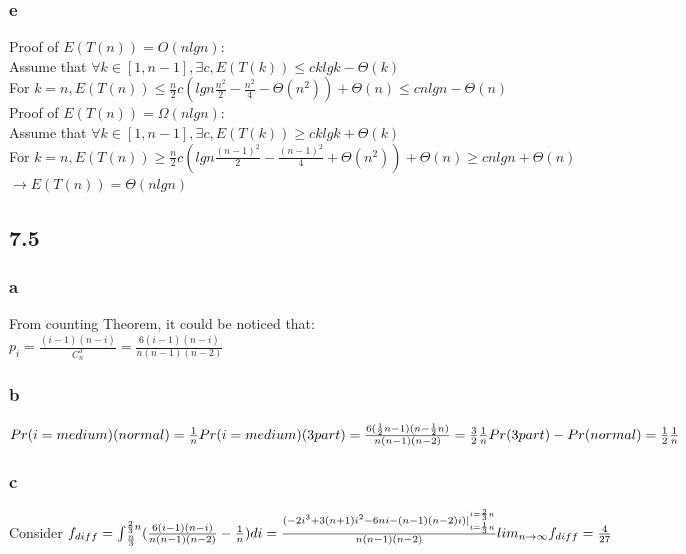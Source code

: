 \documentclass[]{article}
\begin{document}
\subsubsection{e}
Proof of $E(T(n)) = O(nlgn)$:\\
Assume that $\forall k \in [1, n-1], \exists c, E(T(k)) \le cklgk - \Theta(k)$\\
For $k = n, E(T(n)) \le \frac{n}{2}c(lgn\frac{n^2}{2} - \frac{n^2}{4} - \Theta (n^2)) + \Theta(n) \le cnlgn - \Theta(n) $\\
Proof of $E(T(n)) =\Omega(nlgn)$:\\
Assume that $\forall k \in [1, n-1], \exists c, E(T(k)) \ge cklgk + \Theta(k)$\\
For $k = n, E(T(n)) \ge \frac{n}{2}c(lgn\frac{(n-1)^2}{2} - \frac{(n-1)^2}{4} + \Theta(n^2)) + \Theta(n) \ge cnlgn + \Theta(n)$\\
$\rightarrow E(T(n)) = \Theta(nlgn)$

\subsection{7.5}

\subsubsection{a}
From counting Theorem, it could be noticed that:\\
$p_{i} = \frac{(i-1)(n-i)}{C_{n}^{3}} = \frac{6(i-1)(n-i)}{n(n-1)(n-2)}$

\subsubsection{b}
$Pr(i = medium) (normal) = \frac{1}{n}\\
Pr(i = medium) (3part) = \frac{6(\frac{1}{2}n-1)(n-\frac{1}{2}n)}{n(n-1)(n-2)} = \frac{3}{2}\frac{1}{n}\\
Pr(3part) - Pr(normal) = \frac{1}{2}\frac{1}{n}$

\subsubsection{c}
Consider $f_{diff}= {\int }_{\frac{n}{3}}^{\frac{2}{3}n} (\frac{6(i-1)(n-i)}{n(n-1)(n-2)} - \frac{1}{n})di\\
 = \frac{(-2i^3 + 3(n+1)i^2 - 6ni - (n-1)(n-2)i)|_{i = \frac{1}{3}n}^{i = \frac{2}{3}n}}{n(n-1)(n-2)}\\
{lim}_{n\to \infty} f_{diff} = \frac{4}{27}$
\end{document}

